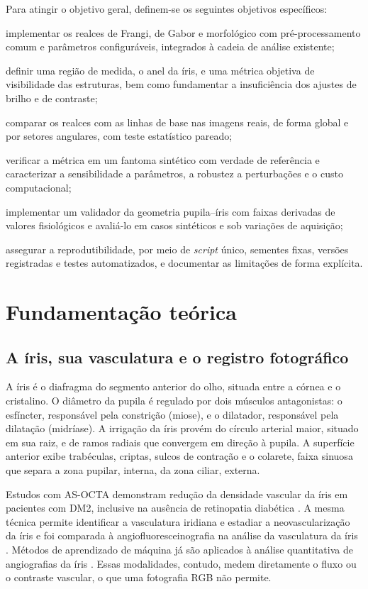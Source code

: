 \documentclass[12pt, oneside, a4paper, chapter=TITLE, section=TITLE,
               english, brazil]{abntex2}
\newcommand{\secao}[1]{\section[\texorpdfstring{\protect\MakeTextUppercase{#1}}{#1}]{#1}}
\begin{document}
Para atingir o objetivo geral, definem-se os seguintes objetivos específicos:
\begin{alineas}
  \item implementar os realces de Frangi, de Gabor e morfológico com
  pré-processamento comum e parâmetros configuráveis, integrados à cadeia de
  análise existente;
  \item definir uma região de medida, o anel da íris, e uma métrica objetiva
  de visibilidade das estruturas, bem como fundamentar a insuficiência dos
  ajustes de brilho e de contraste;
  \item comparar os realces com as linhas de base nas imagens reais, de forma
  global e por setores angulares, com teste estatístico pareado;
  \item verificar a métrica em um fantoma sintético com verdade de referência
  e caracterizar a sensibilidade a parâmetros, a robustez a perturbações e o
  custo computacional;
  \item implementar um validador da geometria pupila--íris com faixas
  derivadas de valores fisiológicos e avaliá-lo em casos sintéticos e sob
  variações de aquisição;
  \item assegurar a reprodutibilidade, por meio de \emph{script} único,
  sementes fixas, versões registradas e testes automatizados, e documentar as
  limitações de forma explícita.
\end{alineas}

\chapter{Fundamentação teórica}
\label{cap:fundamentacao}

\secao{A íris, sua vasculatura e o registro fotográfico}

A íris é o diafragma do segmento anterior do olho, situada entre a córnea e o
cristalino. O diâmetro da pupila é regulado por dois músculos antagonistas: o
esfíncter, responsável pela constrição (miose), e o dilatador, responsável
pela dilatação (midríase). A irrigação da íris provém do círculo arterial
maior, situado em sua raiz, e de ramos radiais que convergem em direção à
pupila. A superfície anterior exibe trabéculas, criptas, sulcos de contração e
o colarete, faixa sinuosa que separa a zona pupilar, interna, da zona ciliar,
externa.

Estudos com AS-OCTA demonstram redução da densidade vascular da íris em
pacientes com DM2, inclusive na ausência de retinopatia diabética
\citep*{Zhou2025}. A mesma técnica permite identificar a vasculatura iridiana
e estadiar a neovascularização da íris \citep*{Roberts2017} e foi comparada à
angiofluoresceinografia na análise da vasculatura da íris \citep*{Zett2018}.
Métodos de aprendizado de máquina já são aplicados à análise quantitativa de
angiografias da íris \citep*{Zhu2026}. Essas modalidades, contudo, medem
diretamente o fluxo ou o contraste vascular, o que uma fotografia RGB não
permite.
\end{document}
